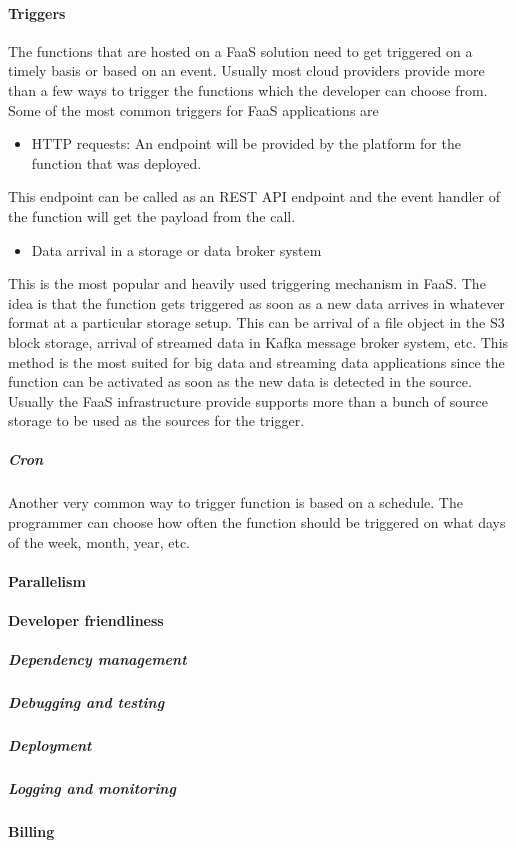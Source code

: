 \documentclass[12pt,titlepage]{article}
\begin{document}
\paragraph{Triggers}
\label{sec:orgf14c121}
The functions that are hosted on a FaaS solution need to get triggered on a timely
basis or based on an event. Usually most cloud providers provide more than a few
ways to trigger the functions which the developer can choose from. Some of the
most common triggers for FaaS applications are
\begin{itemize}
\item HTTP requests: An endpoint will be provided by the platform for the function that was deployed.
\end{itemize}
This endpoint can be called as an REST API endpoint and the event handler of
the function will get the payload from the call.
\begin{itemize}
\item Data arrival in a storage or data broker system
\end{itemize}
This is the most popular and heavily used triggering mechanism in FaaS. The idea
is that the function gets triggered as soon as a new data arrives in whatever
format at a particular storage setup. This can be arrival of a file object in
the S3 block storage, arrival of streamed data in Kafka message broker system,
etc. This method is the most suited for big data and streaming data applications
since the function can be activated as soon as the new data is detected in the
source. Usually the FaaS infrastructure provide supports more than a bunch of
source storage to be used as the sources for the trigger.
\subparagraph{Cron}
\label{sec:org832bd9d}
Another very common way to trigger function is based on a schedule. The
programmer can choose how often the function should be triggered on what days of
the week, month, year, etc. 
\paragraph{Parallelism}
\label{sec:orgc0c6dff}
\paragraph{Developer friendliness}
\label{sec:orgada63f7}
\subparagraph{Dependency management}
\label{sec:org2a787d4}
\subparagraph{Debugging and testing}
\label{sec:org1f0e948}
\subparagraph{Deployment}
\label{sec:org46055c8}
\subparagraph{Logging and monitoring}
\label{sec:org9f5cf8e}
\paragraph{Billing}
\label{sec:org8dc17ad}
\end{document}
